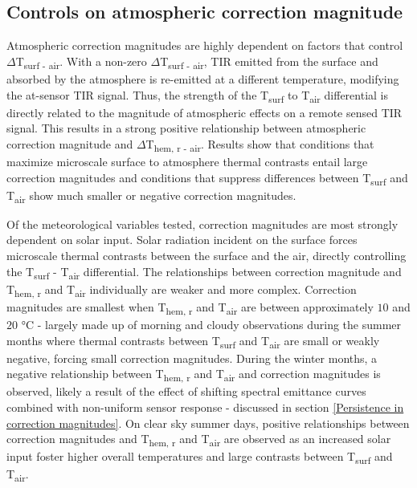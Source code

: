 \begin{bibunit}
\subsection{Controls on atmospheric correction magnitude}

Atmospheric correction magnitudes are highly dependent on factors that control $\Delta$T\textsubscript{surf - air}. With a non-zero $\Delta$T\textsubscript{surf - air}, TIR emitted from the surface and absorbed by the atmosphere is re-emitted at a different temperature, modifying the at-sensor TIR signal. Thus, the strength of the T\textsubscript{surf} to T\textsubscript{air} differential is directly related to the magnitude of atmospheric effects on a remote sensed TIR signal. This results in a strong positive relationship between atmospheric correction magnitude and $\Delta$T\textsubscript{hem, r - air}. Results show that conditions that maximize microscale surface to atmosphere thermal contrasts entail large correction magnitudes and conditions that suppress differences between T\textsubscript{surf} and T\textsubscript{air} show much smaller or negative correction magnitudes.

Of the meteorological variables tested, correction magnitudes are most strongly dependent on solar input. Solar radiation incident on the surface forces microscale thermal contrasts between the surface and the air, directly controlling the T\textsubscript{surf} - T\textsubscript{air} differential. The relationships between correction magnitude and T\textsubscript{hem, r} and T\textsubscript{air} individually are weaker and more complex. Correction magnitudes are smallest when T\textsubscript{hem, r} and T\textsubscript{air} are between approximately $10$ and $20$ \si{\degreeCelsius} - largely made up of morning and cloudy observations during the summer months where thermal contrasts between T\textsubscript{surf} and T\textsubscript{air} are small or weakly negative, forcing small correction magnitudes. During the winter months, a negative relationship between T\textsubscript{hem, r} and T\textsubscript{air} and correction magnitudes is observed, likely a result of the effect of shifting spectral emittance curves combined with non-uniform sensor response - discussed in section \ref{Persistence in correction magnitudes}. On clear sky summer days, positive relationships between correction magnitudes and T\textsubscript{hem, r} and T\textsubscript{air} are observed as an increased solar input foster higher overall temperatures and large contrasts between T\textsubscript{surf} and T\textsubscript{air}.


\end{bibunit}
